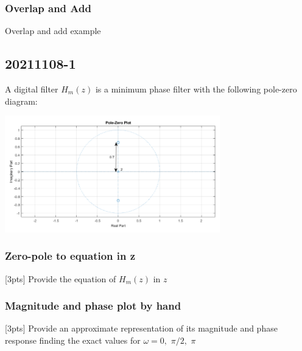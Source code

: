     \subsubsection{Overlap and Add}
    Overlap and add example


\pagebreak\subsection{20211108-1}
    A digital filter $H_m(z)$ is a minimum phase filter with the following pole-zero diagram:
    \begin{center}
        \includegraphics[width=0.7\textwidth]{images/20211108_11.png}
    \end{center}

    \subsubsection{Zero-pole to equation in z}
    [3pts] Provide the equation of $H_m(z)$ in $z$


    \subsubsection{Magnitude and phase plot by hand}
    [3pts] Provide an approximate representation of its magnitude and phase response finding the exact values for $\omega=0,\,\,\pi/2,\,\,\pi$


